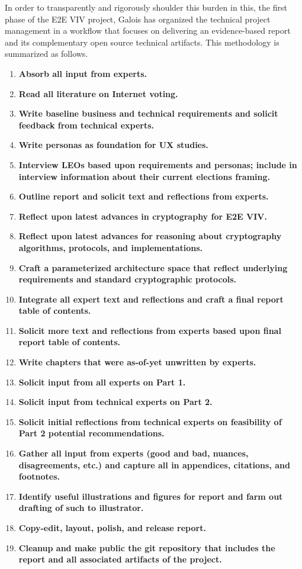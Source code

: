 In order to transparently and rigorously shoulder this burden in this,
the first phase of the E2E VIV project, Galois has organized the
technical project management in a workflow that focuses on delivering
an evidence-based report and its complementary open source technical
artifacts.  This methodology is summarized as follows.

\begin{enumerate}
\item \textbf{Absorb all input from experts.}
\item \textbf{Read all literature on Internet voting.}
\item \textbf{Write baseline business and technical requirements and
    solicit feedback from technical experts.}
\item \textbf{Write personas as foundation for UX studies.}
\item \textbf{Interview LEOs based upon requirements and personas;
    include in interview information about their current elections
    framing.}
\item \textbf{Outline report and solicit text and reflections from
    experts.}
\item \textbf{Reflect upon latest advances in cryptography for E2E VIV.}
\item \textbf{Reflect upon latest advances for reasoning about
    cryptography algorithms, protocols, and implementations.}
\item \textbf{Craft a parameterized architecture space that reflect
    underlying requirements and standard cryptographic protocols.}
\item \textbf{Integrate all expert text and reflections and craft a
    final report table of contents.}
\item \textbf{Solicit more text and reflections from experts based
    upon final report table of contents.}
\item \textbf{Write chapters that were as-of-yet unwritten by experts.}
\item \textbf{Solicit input from all experts on Part 1.}
\item \textbf{Solicit input from technical experts on Part 2.}
\item \textbf{Solicit initial reflections from technical experts on
    feasibility of Part 2 potential recommendations.}
\item \textbf{Gather all input from experts (good and bad, nuances,
    disagreements, etc.) and capture all in appendices, citations, and
    footnotes.}
\item \textbf{Identify useful illustrations and figures for report and
    farm out drafting of such to illustrator.}
\item \textbf{Copy-edit, layout, polish, and release report.}
\item \textbf{Cleanup and make public the git repository that includes
  the report and all associated artifacts of the project.}
\end{enumerate}

